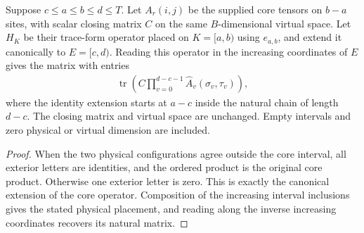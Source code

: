 \begin{lemma}
    \label{thm:physical_interval_nested_trace}
    \leanok
    Suppose $c\le a\le b\le d\le T$. Let $A_r(i,j)$ be the supplied core
    tensors on $b-a$ sites, with scalar closing matrix $C$ on the same
    $B$-dimensional virtual space. Let $H_K$ be their trace-form operator
    placed on $K=[a,b)$ using $e_{a,b}$, and extend it canonically to
    $E=[c,d)$. Reading this operator in the increasing coordinates of $E$
    gives the matrix with entries
    \begin{align}
        \operatorname{tr}\left(C\prod_{v=0}^{d-c-1}
        \widehat A_v(\sigma_v,\tau_v)\right),
        \label{eq:physical_interval_nested_trace}
    \end{align}
    where the identity extension starts at $a-c$ inside the natural chain
    of length $d-c$. The closing matrix and virtual space are unchanged.
    Empty intervals and zero physical or virtual dimension are included.
\end{lemma}
\begin{proof}\leanok
    When the two physical configurations agree outside the core interval,
    all exterior letters are identities, and the ordered product is the
    original core product. Otherwise one exterior letter is zero. This
    is exactly the canonical extension of the core operator. Composition
    of the increasing interval inclusions gives the stated physical
    placement, and reading along the inverse increasing coordinates
    recovers its natural matrix.
\end{proof}

